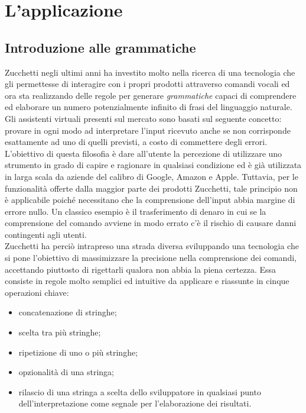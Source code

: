 
\chapter{L'applicazione}
\label{cap:applicazione}


\section{Introduzione alle grammatiche}
Zucchetti negli ultimi anni ha investito molto nella ricerca di una tecnologia che gli permettesse di interagire con i propri prodotti attraverso comandi vocali ed ora sta realizzando delle regole per generare \emph{grammatiche} capaci di comprendere ed elaborare un numero potenzialmente infinito di frasi del linguaggio naturale. \\
Gli assistenti virtuali presenti sul mercato sono basati sul seguente concetto: provare in ogni modo ad interpretare l'input ricevuto anche se non corrisponde esattamente ad uno di quelli previsti, a costo di commettere degli errori. L'obiettivo di questa filosofia è dare all'utente la percezione di utilizzare uno strumento in grado di capire e ragionare in qualsiasi condizione ed è già utilizzata in larga scala da aziende del calibro di Google, Amazon e Apple. Tuttavia, per le funzionalità offerte dalla maggior parte dei prodotti Zucchetti, tale principio non è applicabile poiché necessitano che la comprensione dell'input abbia margine di errore nullo. Un classico esempio è il trasferimento di denaro in cui se la comprensione del comando avviene in modo errato c'è il rischio di causare danni contingenti agli utenti. \\
Zucchetti ha perciò intrapreso una strada diversa sviluppando una tecnologia che si pone l'obiettivo di massimizzare la precisione nella comprensione dei comandi, accettando piuttosto di rigettarli qualora non abbia la piena certezza. Essa consiste in regole molto semplici ed intuitive da applicare e riassunte in cinque operazioni chiave:
\begin{itemize}
	\item concatenazione di stringhe;
	\item scelta tra più stringhe;
	\item ripetizione di uno o più stringhe;
	\item opzionalità di una stringa;
	\item rilascio di una stringa a scelta dello sviluppatore in qualsiasi punto dell'interpretazione come segnale per l'elaborazione dei risultati.
\end{itemize}

